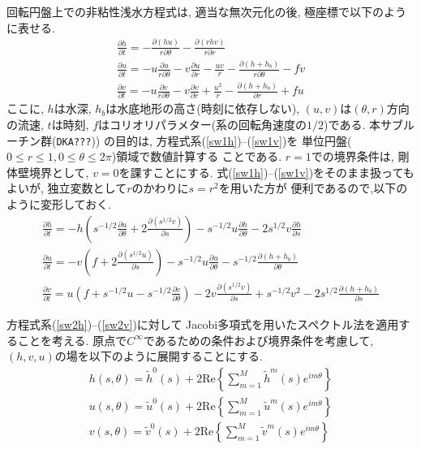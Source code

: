 \documentclass[a4j,fleqn]{jarticle}
\begin{document}
回転円盤上での非粘性浅水方程式は, 適当な無次元化の後, 
極座標で以下のように表せる.
\begin{gather}
\frac{\partial h}{\partial t}
= -\frac{\partial(hu)}{r\partial\theta}
   -\frac{\partial(rhv)}{r\partial r}
\label{sw1h}\\
\frac{\partial u}{\partial t}
= -u\frac{\partial u}{r\partial\theta}
   -v\frac{\partial u}{\partial r}
   -\frac{uv}{r}
   -\frac{\partial (h+h_b)}{r\partial\theta}
   -fv
\label{sw1u}\\
\frac{\partial v}{\partial t}
= -u\frac{\partial v}{r\partial\theta}
   -v\frac{\partial v}{\partial r}
   +\frac{u^2}{r}
   -\frac{\partial (h+h_b)}{\partial r}
   +fu
\label{sw1v}   
\end{gather}
ここに, $h$は水深, $h_b$は水底地形の高さ(時刻に依存しない),
$(u,v)$は$(\theta,r)$方向の流速,
$t$は時刻, $f$はコリオリパラメター(系の回転角速度の$1/2$)である.
本サブルーチン群({\tt DKA???}))
の目的は, 方程式系(\ref{sw1h})--(\ref{sw1v})を
単位円盤($0\le r\le 1, 0\le\theta\le 2\pi$)領域で数値計算する
ことである.
$r=1$での境界条件は, 剛体壁境界として, $v=0$を課すことにする.
式(\ref{sw1h})--(\ref{sw1v})をそのまま扱ってもよいが, 
独立変数として$r$のかわりに$s=r^2$を用いた方が
便利であるので,以下のように変形しておく.
\begin{gather}
\frac{\partial h}{\partial t}
= 
-h\left(s^{-1/2}\frac{\partial u}{\partial\theta}
   +2\frac{\partial( s^{1/2}v)}{\partial s}\right)
   -s^{-1/2}u\frac{\partial h}{\partial\theta}
   -2s^{1/2}v\frac{\partial h}{\partial s}
   \label{sw2h}\\
\frac{\partial u}{\partial t}
= -v\left(f+2\frac{\partial(s^{1/2}u)}{\partial s}\right)
   -s^{-1/2}u\frac{\partial u}{\partial\theta}
   -s^{-1/2}\frac{\partial (h+h_b)}{\partial\theta}
   \label{sw2u}\\
\frac{\partial v}{\partial t}
= 
u\left(f+s^{-1/2}u-s^{-1/2}\frac{\partial v}{\partial\theta}\right)
   -2v\frac{\partial(s^{1/2}v)}{\partial s}
   +s^{-1/2}v^2
   -2s^{1/2}\frac{\partial (h+h_b)}{\partial s}
   \label{sw2v}
\end{gather}

方程式系(\ref{sw2h})--(\ref{sw2v})に対して
Jacobi多項式を用いたスペクトル法を適用することを考える.
原点で$C^{\infty}$であるための条件および境界条件を考慮して,
$(h,v,u)$の場を以下のように展開することにする.
\begin{gather}
h(s,\theta) =\tilde h^0(s)+2\mbox{Re}\left\{\sum^M_{m=1}\tilde h^m(s)
e^{im\theta}\right\}
\label{hexpn}\\
u(s,\theta) =\tilde u^0(s)+2\mbox{Re}\left\{\sum^M_{m=1}\tilde u^m(s)
e^{im\theta}\right\}
\label{uexpn}\\
v(s,\theta) =\tilde v^0(s)+2\mbox{Re}\left\{\sum^M_{m=1}\tilde v^m(s)
e^{im\theta}\right\}
\label{vexpn}
\end{gather}
\end{document}
